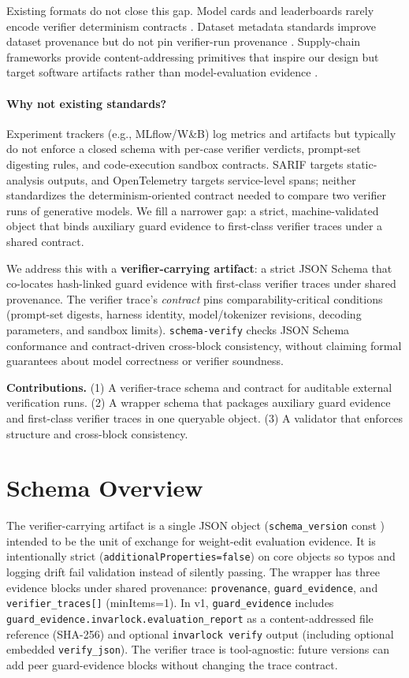 \documentclass{article} %
\newcommand{\schemaverify}{\texttt{schema-verify}\xspace}
\begin{document}
Existing formats do not close this gap.
Model cards and leaderboards rarely encode verifier determinism contracts \citep{mitchell2019model_cards}.
Dataset metadata standards improve dataset provenance but do not pin verifier-run provenance
\citep{akhtar2024croissant}.
Supply-chain frameworks provide content-addressing primitives that inspire our design but target
software artifacts rather than model-evaluation evidence \citep{slsa2024spec}.

\paragraph{Why not existing standards?}
Experiment trackers (e.g., MLflow/W\&B) log metrics and artifacts but typically do not enforce a
closed schema with per-case verifier verdicts, prompt-set digesting rules, and code-execution
sandbox contracts.
SARIF targets static-analysis outputs, and OpenTelemetry targets service-level spans; neither
standardizes the determinism-oriented contract needed to compare two verifier runs of generative
models.
We fill a narrower gap: a strict, machine-validated object that binds auxiliary guard evidence to
first-class verifier traces under a shared contract.

We address this with a \textbf{verifier-carrying artifact}: a strict JSON Schema that co-locates
hash-linked guard evidence with first-class verifier traces under shared provenance.
The verifier trace's \emph{contract} pins comparability-critical conditions (prompt-set digests,
harness identity, model/tokenizer revisions, decoding parameters, and sandbox limits).
\schemaverify checks JSON Schema conformance and contract-driven cross-block consistency, without
claiming formal guarantees about model correctness or verifier soundness.

\textbf{Contributions.}
(1) A verifier-trace schema and contract for auditable external verification runs.
(2) A wrapper schema that packages auxiliary guard evidence and first-class verifier traces in one
queryable object.
(3) A validator that enforces structure and cross-block consistency.

\section{Schema Overview}
The verifier-carrying artifact is a single JSON object
(\texttt{schema\_version} const ) intended to be the unit of
exchange for weight-edit evaluation evidence.
It is intentionally strict (\texttt{additionalProperties=false}) on core objects so typos and
logging drift fail validation instead of silently passing.
The wrapper has three evidence blocks under shared provenance:
\texttt{provenance}, \texttt{guard\_evidence}, and \texttt{verifier\_traces[]} (minItems=1).
In v1, \texttt{guard\_evidence} includes \texttt{guard\_evidence.invarlock.evaluation\_report} as a
content-addressed file reference (SHA-256) and optional \texttt{invarlock verify} output (including
optional embedded \texttt{verify\_json}).
The verifier trace is tool-agnostic: future versions can add peer guard-evidence blocks without
changing the trace contract.
\end{document}
